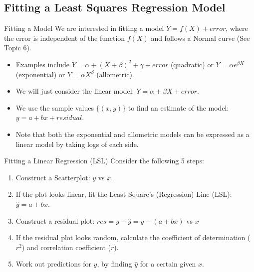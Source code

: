 \documentclass[t,xcolor=pdftex,dvipsnames,table]{beamer}\usepackage[]{graphicx}\usepackage[]{color}
\begin{document}
\subsection[]{Fitting a Least Squares Regression Model}
\begin{frame}[fragile]{Fitting a Model}
We are interested in fitting a model $Y = f(X) + error$, where the error is independent of the function $f(X)$ and follows a Normal curve (See Topic 6).

\begin{itemize}
\item
Examples include
$Y = \alpha + (X+\beta)^2 + \gamma + error$ (quadratic) or $Y=\alpha e^{\beta X}$ (exponential) or $Y=\alpha X^{\beta}$ (allometric).

\item
We will just consider the linear model: $Y = \alpha + \beta X + error$. 

\item
We use the sample values $\{ (x,y) \}$ to find an estimate of the model:
$y = a + b x + residual$.

\item
Note that both the exponential and allometric models can be expressed as a linear model by taking logs of each side.
\end{itemize}
\end{frame}



\begin{frame}[fragile]{Fitting a Linear Regression (LSL)}
Consider the following 5 steps:  
\begin{enumerate}

\item 
Construct a Scatterplot: $y$ vs $x$.

\item
If the plot looks linear, fit the Least Square’s (Regression) Line (LSL): $\hat{y} = a + b x$. 

\item
Construct a residual plot: $res= y-\hat{y} = y-(a+bx)$ vs $x$

\item
If the residual plot looks random, calculate the coefficient of determination ($r^2$) and correlation coefficient ($r$).

\item
Work out predictions for $y$, by finding $\hat{y}$ for a certain given $x$.
\end{enumerate}
\end{frame}
\end{document}
